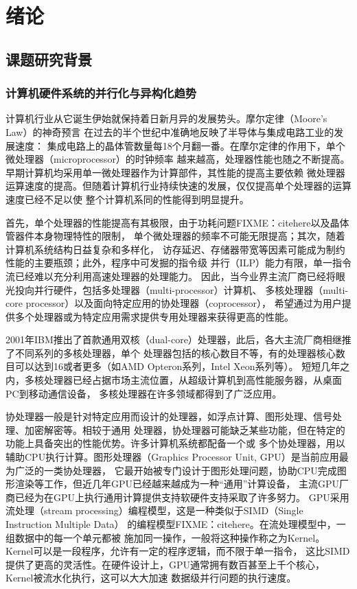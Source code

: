 \chapter{绪论}

\section{课题研究背景}

\subsection{计算机硬件系统的并行化与异构化趋势}
计算机行业从它诞生伊始就保持着日新月异的发展势头。摩尔定律（Moore's Law）\cite{moore1965}的神奇预言
在过去的半个世纪中准确地反映了半导体与集成电路工业的发展速度：
集成电路上的晶体管数量每18个月翻一番。在摩尔定律的作用下，单个微处理器（microprocessor）的时钟频率
越来越高，处理器性能也随之不断提高。早期计算机均采用单一微处理器作为计算部件，其性能的提高主要依赖
微处理器运算速度的提高。但随着计算机行业持续快速的发展，仅仅提高单个处理器的运算速度已经不足以使
整个计算机系同的性能得到明显提升。

首先，单个处理器的性能提高有其极限，由于功耗问题FIXME：citehere以及晶体管器件本身物理特性的限制，
单个微处理器的频率不可能无限提高；其次，随着计算机系统结构日益复杂和多样化，
访存延迟、存储器带宽等因素可能成为制约性能的主要瓶颈；此外，程序中可发掘的指令级
并行（ILP）能力有限，单一指令流已经难以充分利用高速处理器的处理能力。
因此，当今业界主流厂商已经将眼光投向并行硬件，包括多处理器（multi-processor）计算机、
多核处理器（multi-core processor）以及面向特定应用的协处理器（coprocessor），
希望通过为用户提供多个处理器或为特定应用需求提供专用处理器来获得更高的性能。

2001年IBM推出了首款通用双核（dual-core）处理器，此后，各大主流厂商相继推了不同系列的多核处理器，单个
处理器包括的核心数目不等，有的处理器核心数目可以达到16或者更多（如AMD Opteron系列，Intel Xeon系列等）。
短短几年之内，多核处理器已经占据市场主流位置，从超级计算机到高性能服务器，从桌面PC到移动通信设备，
多核处理器在许多领域都得到了广泛应用。

协处理器一般是针对特定应用而设计的处理器，如浮点计算、图形处理、信号处理、加密解密等。相较于通用
处理器，协处理器可能缺乏某些功能，但在特定的功能上具备突出的性能优势。许多计算机系统都配备一个或
多个协处理器，用以辅助CPU执行计算。图形处理器（Graphics Processor Unit, GPU）是当前应用最为广泛的一类协处理器，
它最开始被专门设计于图形处理问题，协助CPU完成图形渲染等工作，但近几年GPU已经越来越成为一种“通用”计算设备，
主流GPU厂商已经为在GPU上执行通用计算提供支持软硬件支持采取了许多努力。
GPU采用流处理（stream processing）编程模型，这是一种类似于SIMD（Single Instruction Multiple Data）
的编程模型FIXME：citehere。在流处理模型中，一组数据中的每一个单元都被
施加同一操作，一般将这种操作称之为Kernel。Kernel可以是一段程序，允许有一定的程序逻辑，而不限于单一指令，
这比SIMD提供了更高的灵活性。在硬件设计上，GPU通常拥有数百甚至上千个核心，Kernel被流水化执行，这可以大大加速
数据级并行问题的执行速度。

